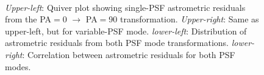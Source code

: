 \documentclass[]{spie}  %
\begin{document}
\begin{figure}
  \centering
  \\
  \hspace{-1cm}
  \caption{\textit{Upper-left}: Quiver plot showing single-PSF astrometric residuals from the PA$=$0 $\rightarrow$ PA$=$90 transformation. \textit{Upper-right}: Same as upper-left, but for variable-PSF mode. \textit{lower-left}: Distribution of astrometric residuals from both PSF mode transformations. \textit{lower-right}: Correlation between astrometric residuals for both PSF modes.} \label{fig:m53_PA_compare}
\end{figure}
\end{document}
